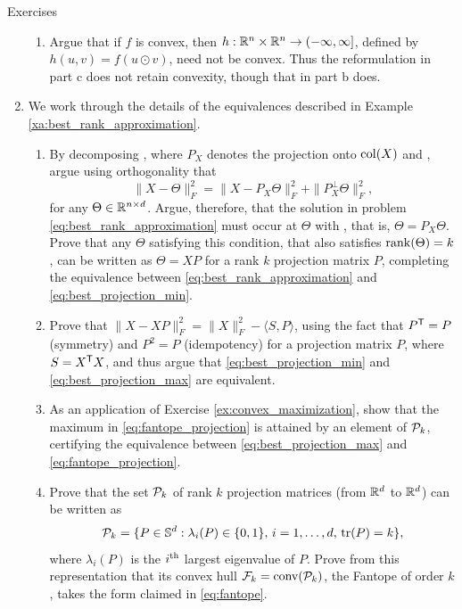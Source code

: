 \begin{xcb}{Exercises}
\begin{enumerate}[label=\thechapter.\arabic*]
\begin{enumerate}[label=\alph*.]
\item Argue that if $f$ is convex, then $h : \mathbb{R}^n \times \mathbb{R}^n \to
  (-\infty,\infty]$, defined by $h(u,v) = f(u \odot v)$, need not be
  convex. Thus the reformulation in part c does not retain convexity, though
  that in part b does. 
\end{enumerate}

\item \label{ex:best_rank_approximation}
  We work through the details of the equivalences described in Example
  \ref{xa:best_rank_approximation}.  

\begin{enumerate}[label=\alph*.]
\item By decomposing , where 
  $P_X$ denotes the projection onto $\operatorname{col}(X)$ and ,
  argue using orthogonality that 
  \[
  \|X - \Theta\|_F^2 = \|X - P_X \Theta\|_F^2 + \|P_X^\perp \Theta\|_F^2,
  \]
  for any $\Theta \in \mathbb{R}^{n \times d}$. Argue, therefore, that the solution in 
  problem \eqref{eq:best_rank_approximation} must occur at $\Theta$ with 
  , that is, $\Theta = P_X \Theta$. Prove that any
  $\Theta$ satisfying this condition, that also satisfies $\operatorname{rank}(\Theta) = k$,
  can be written as $\Theta = XP$ for a rank $k$ projection matrix $P$,
  completing the equivalence between \eqref{eq:best_rank_approximation} and  
  \eqref{eq:best_projection_min}. 

\item Prove that $\|X - XP\|_F^2 = \|X\|_F^2 - \langle S, P \rangle$, using the
  fact that $P^{\mathsf{T}} = P$ (symmetry) and $P^2 = P$ (idempotency) for a projection
  matrix $P$, where $S = X^{\mathsf{T}} X$, and thus argue that
  \eqref{eq:best_projection_min} and \eqref{eq:best_projection_max} are
  equivalent. 

\item As an application of Exercise \ref{ex:convex_maximization}, show that
  the maximum in \eqref{eq:fantope_projection} is attained by an element of 
  $\mathcal{P}_k$, certifying the equivalence between \eqref{eq:best_projection_max} and
  \eqref{eq:fantope_projection}.

\item Prove that the set $\mathcal{P}_k$ of rank $k$ projection matrices (from $\mathbb{R}^d$ to 
  $\mathbb{R}^d$) can be written as
  \[
  \mathcal{P}_k = \{ P \in \mathbb{S}^d : \lambda_i(P) \in \{0,1\}, \, i=1,\ldots,d, \, \operatorname{tr}(P)
  = k\},
  \]
  where $\lambda_i(P)$ is the $i^{\textnormal{th}}$ largest eigenvalue of $P$. Prove from this 
  representation that its convex hull $\mathcal{F}_k = \operatorname{conv}(\mathcal{P}_k)$, the Fantope of
  order $k$, takes the form claimed in \eqref{eq:fantope}. 
\end{enumerate}


\end{enumerate}
\end{xcb}
